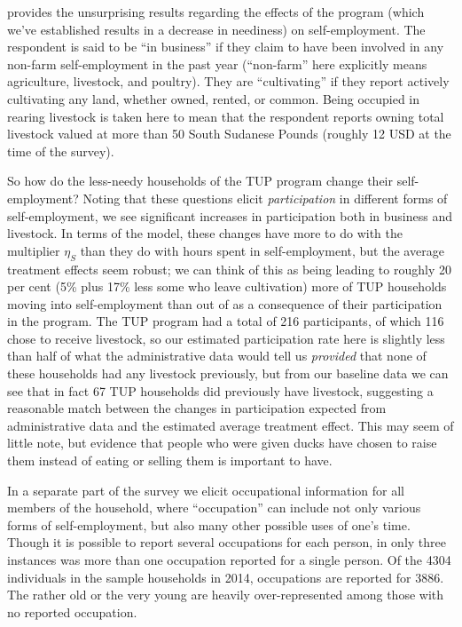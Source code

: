 \documentclass[11pt]{article}
\begin{document}
 provides the unsurprising results regarding
the effects of the program (which we've established results in a
decrease in neediness) on self-employment.  
The respondent is said to be ``in business'' if they claim to have been
involved in any non-farm self-employment in the past year (``non-farm''
here explicitly means agriculture, livestock, and poultry).  They are
``cultivating'' if they report actively cultivating any land, whether
owned, rented, or common.  Being occupied in rearing livestock is
taken here to mean that the respondent reports owning total livestock
valued at more than 50 South Sudanese Pounds (roughly 12 USD at the
time of the survey).

So how do the less-needy households of the TUP program change their
self-employment?  Noting that these questions elicit \emph{participation} in
different forms of self-employment, we see significant increases in
participation both in business and livestock.  In terms of the model,
these changes have more to do with the multiplier $\eta_S$ than they
do with hours spent in self-employment, but the average treatment
effects seem robust; we can think of this as being leading to roughly
20 per cent (5\% plus 17\% less some who leave cultivation) more of TUP
households moving into self-employment than out of as a consequence of
their participation in the program.  The TUP program had a total of
216 participants, of which 116 chose to receive livestock, so our
estimated participation rate here is slightly less than half of what
the administrative data would tell us \emph{provided} that none of these
households had any livestock previously, but from our baseline data we
can see that in fact 67 TUP households did previously have livestock,
suggesting a reasonable match between the changes in participation
expected from administrative data and the estimated average treatment
effect.  This may seem of little note, but evidence that people
who were given ducks have chosen to raise them instead of eating or
selling them is important to have.

In a separate part of the survey we elicit occupational information
for all members of the household, where ``occupation'' can include not
only various forms of self-employment, but also many other possible
uses of one's time.  Though it is possible to report
several occupations for each person, in only three instances was more
than one occupation reported for a single person.  Of the 4304
individuals in the sample households in 2014, occupations are reported
for 3886.  The rather old or the very young are heavily
over-represented among those with no reported occupation.   
\end{document}
